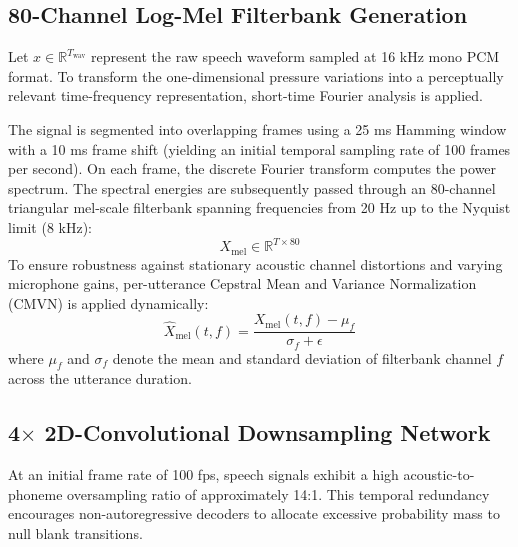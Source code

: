 \subsection{80-Channel Log-Mel Filterbank Generation}
Let $x \in \mathbb{R}^{T_{\text{wav}}}$ represent the raw speech waveform sampled at 16 kHz mono PCM format. To transform the one-dimensional pressure variations into a perceptually relevant time-frequency representation, short-time Fourier analysis is applied.

The signal is segmented into overlapping frames using a 25 ms Hamming window with a 10 ms frame shift (yielding an initial temporal sampling rate of 100 frames per second). On each frame, the discrete Fourier transform computes the power spectrum. The spectral energies are subsequently passed through an 80-channel triangular mel-scale filterbank spanning frequencies from 20 Hz up to the Nyquist limit (8 kHz):
\begin{equation}
    X_{\text{mel}} \in \mathbb{R}^{T \times 80}
\end{equation}
To ensure robustness against stationary acoustic channel distortions and varying microphone gains, per-utterance Cepstral Mean and Variance Normalization (CMVN) is applied dynamically:
\begin{equation}
    \hat{X}_{\text{mel}}(t, f) = \frac{X_{\text{mel}}(t, f) - \mu_f}{\sigma_f + \epsilon}
\end{equation}
where $\mu_f$ and $\sigma_f$ denote the mean and standard deviation of filterbank channel $f$ across the utterance duration.

\subsection{4$\times$ 2D-Convolutional Downsampling Network}
At an initial frame rate of 100 fps, speech signals exhibit a high acoustic-to-phoneme oversampling ratio of approximately 14:1. This temporal redundancy encourages non-autoregressive decoders to allocate excessive probability mass to null blank transitions. 

